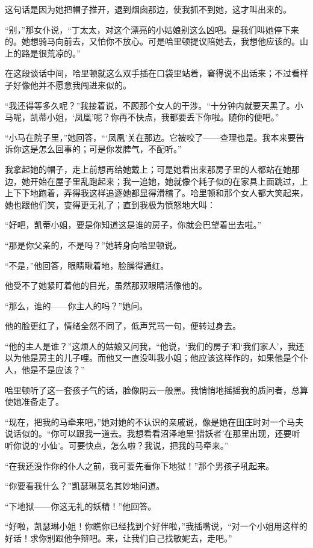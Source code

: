 \par 这句话是因为她把帽子推开，退到烟囱那边，使我抓不到她，这才叫出来的。
\par “别，”那女仆说，“丁太太，对这个漂亮的小姑娘别这么凶吧。是我们叫她停下来的。她想骑马向前去，又怕你不放心。可是哈里顿提议陪她去，我想他应该的。山上的路是很荒凉的。”
\par 在这段谈话中间，哈里顿就这么双手插在口袋里站着，窘得说不出话来；不过看样子好像他并不愿意我闯进来似的。
\par “我还得等多久呢？”我接着说，不顾那个女人的干涉。“十分钟内就要天黑了。小马呢，凯蒂小姐，‘凤凰’呢？你再不快点，我都要丢下你啦。随你的便吧。”
\par “小马在院子里，”她回答，“‘凤凰’关在那边。它被咬了——查理也是。我本来要告诉你这是怎么回事的；可是你发脾气，不配听。”
\par 我拿起她的帽子，走上前想再给她戴上；可是她看出来那房子里的人都站在她那边，她开始在屋子里乱跑起来；我一追她，她就像个耗子似的在家具上面跳过，上上下下地跑着，弄得我这样追逐她都显得滑稽了。哈里顿和那个女人都大笑起来，她也跟他们笑，变得更无礼了；直到我极为愤怒地大叫：
\par “好吧，凯蒂小姐，要是你知道这是谁的房子，你就会巴望着出去啦。”
\par “那是你父亲的，不是吗？”她转身向哈里顿说。
\par “不是，”他回答，眼睛瞅着地，脸臊得通红。
\par 他受不了她紧盯着他的目光，虽然那双眼睛活像他的。
\par “那么，谁的——你主人的吗？”她问。
\par 他的脸更红了，情绪全然不同了，低声咒骂一句，便转过身去。
\par “他的主人是谁？”这烦人的姑娘又问我，“他说，‘我们的房子’和‘我们家人’，我还以为他是房主的儿子哩。而他又一直没叫我小姐；他应该这样作的，如果他是个仆人，他是不是应该？”
\par 哈里顿听了这一套孩子气的话，脸像阴云一般黑。我悄悄地摇摇我的质问者，总算使她准备走了。
\par “现在，把我的马牵来吧，”她对她的不认识的亲戚说，像是她在田庄时对一个马夫说话似的。“你可以跟我一道去。我想看看沼泽地里‘猎妖者’在那里出现，还要听听你说的‘小仙’。可要快点，怎么啦？我说，把我的马牵来。”
\par “在我还没作你的仆人之前，我可要先看你下地狱！”那个男孩子吼起来。
\par “你要看我什么？”凯瑟琳莫名其妙地问道。
\par “下地狱——你这无礼的妖精！”他回答。
\par “好啦，凯瑟琳小姐！你瞧你已经找到个好伴啦，”我插嘴说，“对一个小姐用这样的好话！求你别跟他争辩吧。来，让我们自己找敏妮去，走吧。”
